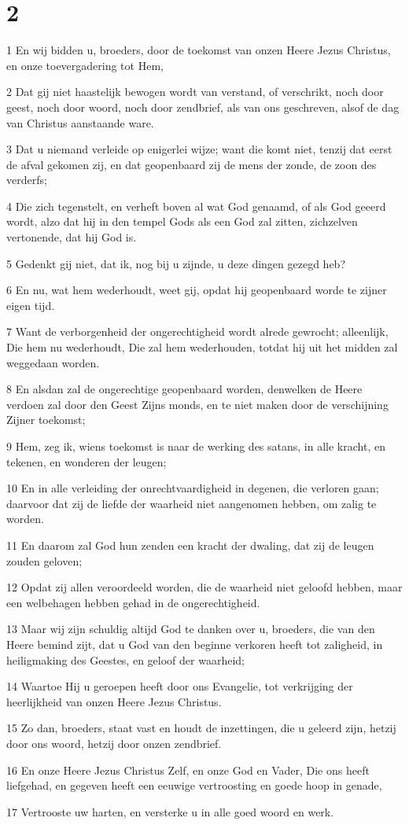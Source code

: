 \chapter{2}

\par 1 En wij bidden u, broeders, door de toekomst van onzen Heere Jezus Christus, en onze toevergadering tot Hem,
\par 2 Dat gij niet haastelijk bewogen wordt van verstand, of verschrikt, noch door geest, noch door woord, noch door zendbrief, als van ons geschreven, alsof de dag van Christus aanstaande ware.
\par 3 Dat u niemand verleide op enigerlei wijze; want die komt niet, tenzij dat eerst de afval gekomen zij, en dat geopenbaard zij de mens der zonde, de zoon des verderfs;
\par 4 Die zich tegenstelt, en verheft boven al wat God genaamd, of als God geeerd wordt, alzo dat hij in den tempel Gods als een God zal zitten, zichzelven vertonende, dat hij God is.
\par 5 Gedenkt gij niet, dat ik, nog bij u zijnde, u deze dingen gezegd heb?
\par 6 En nu, wat hem wederhoudt, weet gij, opdat hij geopenbaard worde te zijner eigen tijd.
\par 7 Want de verborgenheid der ongerechtigheid wordt alrede gewrocht; alleenlijk, Die hem nu wederhoudt, Die zal hem wederhouden, totdat hij uit het midden zal weggedaan worden.
\par 8 En alsdan zal de ongerechtige geopenbaard worden, denwelken de Heere verdoen zal door den Geest Zijns monds, en te niet maken door de verschijning Zijner toekomst;
\par 9 Hem, zeg ik, wiens toekomst is naar de werking des satans, in alle kracht, en tekenen, en wonderen der leugen;
\par 10 En in alle verleiding der onrechtvaardigheid in degenen, die verloren gaan; daarvoor dat zij de liefde der waarheid niet aangenomen hebben, om zalig te worden.
\par 11 En daarom zal God hun zenden een kracht der dwaling, dat zij de leugen zouden geloven;
\par 12 Opdat zij allen veroordeeld worden, die de waarheid niet geloofd hebben, maar een welbehagen hebben gehad in de ongerechtigheid.
\par 13 Maar wij zijn schuldig altijd God te danken over u, broeders, die van den Heere bemind zijt, dat u God van den beginne verkoren heeft tot zaligheid, in heiligmaking des Geestes, en geloof der waarheid;
\par 14 Waartoe Hij u geroepen heeft door ons Evangelie, tot verkrijging der heerlijkheid van onzen Heere Jezus Christus.
\par 15 Zo dan, broeders, staat vast en houdt de inzettingen, die u geleerd zijn, hetzij door ons woord, hetzij door onzen zendbrief.
\par 16 En onze Heere Jezus Christus Zelf, en onze God en Vader, Die ons heeft liefgehad, en gegeven heeft een eeuwige vertroosting en goede hoop in genade,
\par 17 Vertrooste uw harten, en versterke u in alle goed woord en werk.

